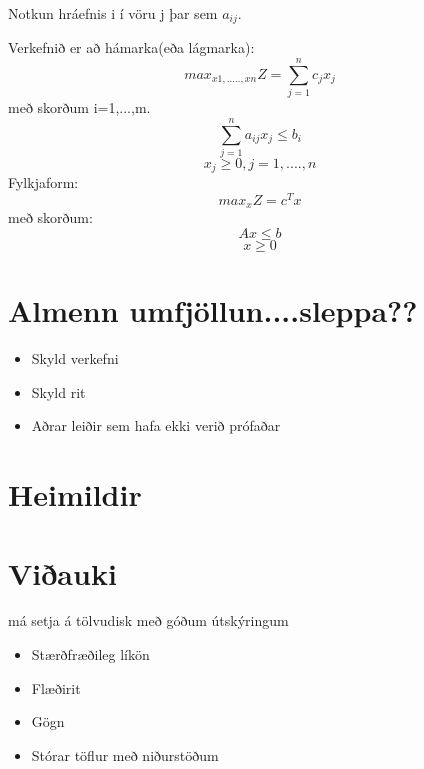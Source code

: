 \documentclass[a4paper,12pt]{article}
\begin{document}
Notkun hráefnis i í vöru j þar sem $a_{ij}$.

Verkefnið er að hámarka(eða lágmarka):
\[max_{x1,.....,xn}Z = \sum_{j=1}^{n}c_j x_j\]
með skorðum i=1,...,m.
\[\sum_{j=1}^{n}a_{ij} x_j\leq b_i\]
\[x_j\geq 0, j=1,....,n\]
Fylkjaform:
\[max_xZ=c^Tx\]
með skorðum:
\[Ax\leq b\]
\[x\geq 0\]

\section{Almenn umfjöllun....sleppa??}
\begin{itemize}
\item Skyld verkefni
\item Skyld rit
\item Aðrar leiðir sem hafa ekki verið prófaðar
\end{itemize}




\pagebreak
\section{Heimildir}



\pagebreak
\section{Viðauki}
má setja á tölvudisk með góðum útskýringum
\begin{itemize}
\item Stærðfræðileg líkön
\item Flæðirit
\item Gögn
\item Stórar töflur með niðurstöðum
\end{itemize}
\end{document}
